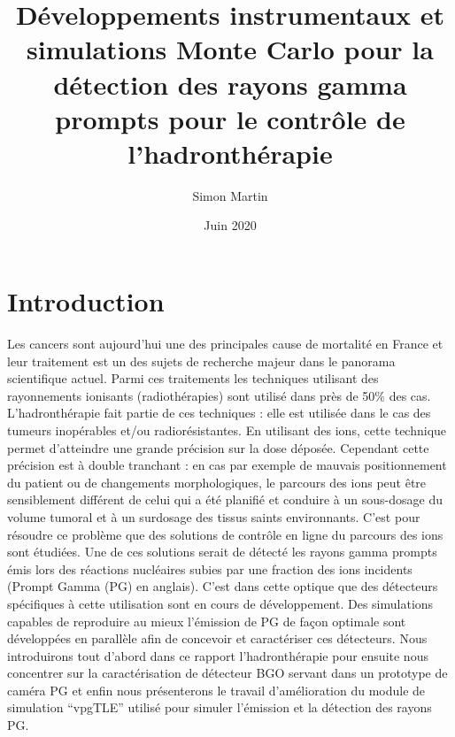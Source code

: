\documentclass[11pt,a4paper,oldfontcommands]{memoir}
\begin{document}
\title{Développements instrumentaux et simulations Monte Carlo pour la détection des rayons gamma prompts pour le contrôle de l’hadronthérapie}
\author{Simon Martin}
\date{Juin 2020}



\maketitle
\newpage
\tableofcontents
\openany
\chapter{Introduction}
Les cancers sont aujourd'hui une des principales cause de mortalité en France et leur traitement est un des sujets de recherche majeur dans le panorama scientifique actuel. Parmi ces traitements les techniques utilisant des rayonnements ionisants (radiothérapies) sont utilisé dans près de 50\% des cas. L'hadronthérapie fait partie de ces techniques
: elle est utilisée dans le cas des tumeurs inopérables et/ou radiorésistantes. En utilisant des ions, cette technique permet d'atteindre une grande précision sur la dose déposée. Cependant cette précision est à double tranchant : en cas par exemple de mauvais positionnement du patient ou de changements morphologiques, le parcours des ions peut être sensiblement différent de celui qui a été planifié et conduire à un sous-dosage du volume tumoral et à un surdosage des tissus saints environnants. C'est pour résoudre ce problème que des solutions de contrôle en ligne du parcours des ions sont étudiées. Une de ces solutions serait de détecté les rayons gamma prompts émis lors des réactions nucléaires subies par une fraction des ions incidents (Prompt Gamma (PG) en anglais). C'est dans cette optique que des détecteurs spécifiques à cette utilisation sont en cours de développement. Des simulations capables de reproduire au mieux l'émission de PG de façon optimale sont développées en parallèle afin de concevoir et caractériser ces détecteurs. Nous introduirons tout d'abord dans ce rapport l'hadronthérapie pour ensuite nous concentrer sur la caractérisation de détecteur BGO servant dans un prototype de caméra PG et enfin nous présenterons le travail d'amélioration du module de simulation \enquote{vpgTLE} utilisé pour simuler l'émission et la détection des rayons PG. 
\openany
\end{document}

